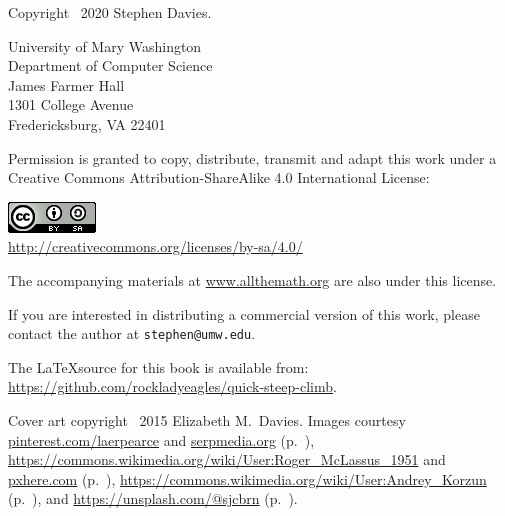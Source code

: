 
\thispagestyle{empty}

Copyright \textcopyright \ 2020 Stephen Davies.

\bigskip

University of Mary Washington\\
Department of Computer Science\\
James Farmer Hall\\
1301 College Avenue\\
Fredericksburg, VA  22401

\vspace{.4in}

Permission is granted to copy, distribute, transmit and adapt this work under a
Creative Commons Attribution-ShareAlike 4.0 International License:

\begin{center}
\includegraphics{cc_license.png}\\
\smallskip
\url{http://creativecommons.org/licenses/by-sa/4.0/}
\end{center}

The accompanying materials at \url{www.allthemath.org} are also under this
license.

\vspace{.2in}
If you are interested in distributing a commercial version of this work, please
contact the author at \texttt{stephen@umw.edu}.

\vspace{.4in}
The \LaTeX source for this book is available from:
\url{https://github.com/rockladyeagles/quick-steep-climb}.


\vspace{.7in}
Cover art copyright \textcopyright \ 2015 Elizabeth M.~Davies.
Images courtesy \url{pinterest.com/laerpearce} and \url{serpmedia.org}
(p.~\pageref{tacoma}),
\url{https://commons.wikimedia.org/wiki/User:Roger\_McLassus\_1951} and
\url{pxhere.com} (p.~\pageref{slinky}),
\url{https://commons.wikimedia.org/wiki/User:Andrey\_Korzun}
(p.~\pageref{orchard}), and \url{https://unsplash.com/@sjcbrn}
(p.~\pageref{fig:stormtrooper}).
